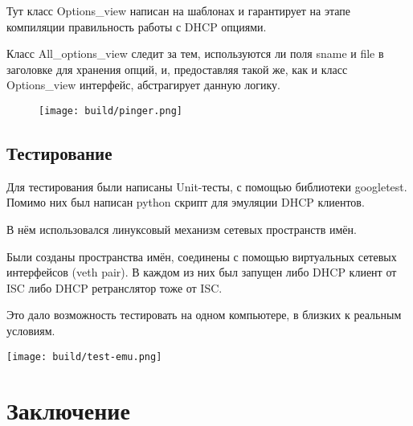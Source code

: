 \documentclass[12pt]{article}
\begin{document}
Тут класс Options\_view написан на шаблонах и гарантирует на этапе компиляции правильность работы с DHCP опциями.

Класс All\_options\_view следит за тем, используются ли поля sname и file в заголовке для хранения опций, и, предоставляя такой же, как и класс Options\_view интерфейс, абстрагирует данную логику.

\begin{figure}[H]
    \texttt{[image: build/pinger.png]}
    \caption{}
\end{figure}

\pagebreak
\subsection{Тестирование}

Для тестирования были написаны Unit-тесты, с помощью библиотеки googletest.
Помимо них был написан python скрипт для эмуляции DHCP клиентов.

В нём использовался линуксовый механизм сетевых пространств имён.

Были созданы пространства имён, соединены с помощью виртуальных сетевых интерфейсов (veth pair). В каждом из них был запущен либо DHCP клиент от ISC либо DHCP ретранслятор тоже от ISC.

Это дало возможность тестировать на одном компьютере, в близких к реальным условиям.

\texttt{[image: build/test-emu.png]}

\pagebreak
\section{Заключение}
\end{document}
